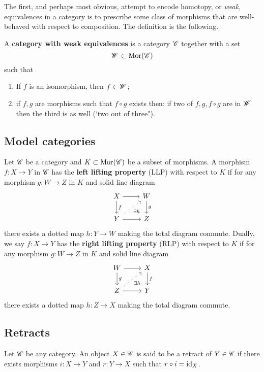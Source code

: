 \documentclass[11pt]{amsart}
\begin{document}
The first, and perhaps most obvious, attempt to encode homotopy, or {\em weak}, equivalences in a category is to prescribe some class of morphisms that are well-behaved with respect to composition. 
The definition is the following. 

\begin{dfn}
A {\bf category with weak equivalences} is a category $\mathscr C$ together with a set
\[
\mathscr W \subset {\rm Mor}(\mathscr C)
\]
such that
\begin{enumerate}
\item If $f$ is an isomorphism, then $f \in \mathscr W$;
\item if $f,g$ are morphisms such that $f \circ g$ exists then: if two of $f, g, f \circ g$ are in $\mathscr W$ then the third is as well (`two out of three").
\end{enumerate}
\end{dfn}

\subsection{Model categories}

\begin{dfn}
Let $\mathscr C$ be a category and $K \subset {\rm Mor}(\mathscr C)$ be a subset of morphisms. 
A morphism $f : X \to Y$ in $\mathscr C$ has the {\bf left lifting property} (LLP) with respect to $K$ if for any morphism $g : W \to Z$ in $K$ and solid line diagram
\[
\begin{tikzcd}
X \ar[r] \ar[d,"f"] & W \ar[d,"g"] \\ 
Y \ar[r] \ar[ur, dotted, "\exists h"'] & Z 
\end{tikzcd}
\]
there exists a dotted map $h : Y \to W$ making the total diagram commute. 
Dually, we say $f : X \to Y$ has the {\bf right lifting property} (RLP) with respect to $K$ if
for any morphism $g : W \to Z$ in $K$ and solid line diagram
\[
\begin{tikzcd}
W \ar[r] \ar[d,"g"] & X \ar[d,"f"] \\ 
Z \ar[r] \ar[ur, dotted, "\exists h"'] & Y
\end{tikzcd}
\]
there exists a dotted map $h : Z \to X$ making the total diagram commute. 
\end{dfn}

\subsection{Retracts}

Let $\mathscr C$ be any category.
An object $X \in \mathscr C$ is said to be a retract of $Y \in \mathscr C$ if there exists morphisms $i : X \to Y$ and $r : Y \to X$ such that $r \circ i = {\rm id}_X$. 
\end{document}
